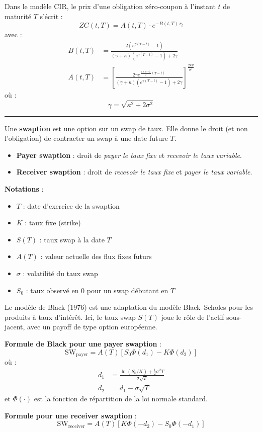 \begin{f}
Dans le modèle CIR, le prix d’une obligation zéro-coupon à l’instant \(t\) de maturité \(T\) s’écrit :
\[
ZC(t, T) = A(t, T) \cdot e^{-B(t, T)\, r_t}
\]
avec :
\[
\begin{aligned}
	B(t, T) &= \frac{2 (e^{\gamma (T - t)} - 1)}{(\gamma + \kappa)(e^{\gamma (T - t)} - 1) + 2\gamma} \\
	A(t, T) &= \left[ \frac{2\gamma e^{\frac{(\kappa + \gamma)}{2}(T - t)}}{(\gamma + \kappa)(e^{\gamma (T - t)} - 1) + 2\gamma} \right]^{\frac{2\kappa\theta}{\sigma^2}}
\end{aligned}
\]
où :
\[
\gamma = \sqrt{\kappa^2 + 2\sigma^2}
\]

\end{f}
\hrule

\begin{f}

Une \textbf{swaption} est une option sur un swap de taux. Elle donne le droit (et non l'obligation) de contracter un swap à une date future \(T\).

\begin{itemize}[nosep]
	\item \textbf{Payer swaption} : droit de \emph{payer le taux fixe} et \emph{recevoir le taux variable}.
	\item \textbf{Receiver swaption} : droit de \emph{recevoir le taux fixe} et \emph{payer le taux variable}.
\end{itemize}

\textbf{Notations} :
\begin{itemize}[nosep]
	\item \(T\) : date d’exercice de la swaption
	\item \(K\) : taux fixe (strike)
	\item \(S(T)\) : taux swap à la date \(T\)
	\item \(A(T)\) : valeur actuelle des flux fixes futurs
	\item \(\sigma\) : volatilité du taux swap
	\item \(S_0\) : taux observé en 0 pour un swap débutant en \(T\)
\end{itemize}

Le modèle de Black (1976) est une adaptation du modèle Black–Scholes pour les produits à taux d'intérêt. Ici, le taux swap \(S(T)\) joue le rôle de l’actif sous-jacent, avec un payoff de type option européenne.

\textbf{Formule de Black pour une payer swaption} :
\[
\text{SW}_{\text{payer}} = A(T) \left[ S_0 \Phi(d_1) - K \Phi(d_2) \right]
\]
où :
\[
\begin{aligned}
	d_1 &= \frac{\ln(S_0 / K) + \frac{1}{2} \sigma^2 T}{\sigma \sqrt{T}} \\
	d_2 &= d_1 - \sigma \sqrt{T}
\end{aligned}
\]
et \(\Phi(\cdot)\) est la fonction de répartition de la loi normale standard.

\textbf{Formule pour une receiver swaption} :
\[
\text{SW}_{\text{receiver}} = A(T) \left[ K \Phi(-d_2) - S_0 \Phi(-d_1) \right]
\]

\end{f}


